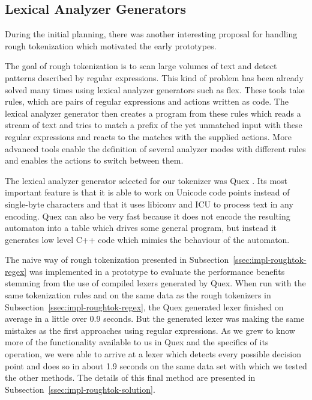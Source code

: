 \subsection{Lexical Analyzer Generators}
\label{ssec:impl-roughtok-lexergen}

During the initial planning, there was another interesting proposal for
handling rough tokenization which motivated the early prototypes.

The goal of rough tokenization is to scan large volumes of text and detect
patterns described by regular expressions. This kind of problem has been
already solved many times using lexical analyzer generators such as flex. These
tools take rules, which are pairs of regular expressions and actions written as
code. The lexical analyzer generator then creates a program from these rules
which reads a stream of text and tries to match a prefix of the yet unmatched
input with these regular expressions and reacts to the matches with the
supplied actions. More advanced tools enable the definition of several analyzer
modes with different rules and enables the actions to switch between them.

The lexical analyzer generator selected for our tokenizer was Quex
\cite{web-quex}. Its most important feature is that it is able to work on
Unicode code points instead of single-byte characters and that it uses libiconv
and ICU to process text in any encoding. Quex can also be very fast because it
does not encode the resulting automaton into a table which drives some general
program, but instead it generates low level C++ code which mimics the behaviour
of the automaton.

The naive way of rough tokenization presented in
Subsection~\ref{ssec:impl-roughtok-regex} was implemented in a prototype to
evaluate the performance benefits stemming from the use of compiled lexers
generated by Quex. When run with the same tokenization rules and on the same
data as the rough tokenizers in Subsection~\ref{ssec:impl-roughtok-regex}, the
Quex generated lexer finished on average in a little over 0.9 seconds. But the
generated lexer was making the same mistakes as the first approaches using
regular expressions. As we grew to know more of the functionality available to
us in Quex and the specifics of its operation, we were able to arrive at a
lexer which detects every possible decision point and does so in about 1.9
seconds on the same data set with which we tested the other methods. The
details of this final method are presented in
Subsection~\ref{ssec:impl-roughtok-solution}.

